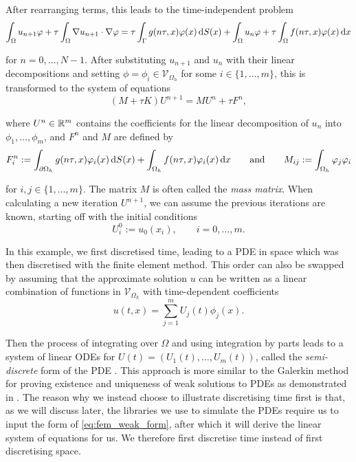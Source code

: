 After rearranging terms, this leads to the time-independent problem
%
\begin{equation}\label{eq:fem_weak_form}
    \int_\Omega u_{n + 1} \varphi + \tau \int_\Omega \nabla u_{n + 1} \cdot \nabla \varphi = \tau \int_\Gamma g(n \tau, x) \varphi(x) \mathop{}\!\mathrm{d} S(x) + \int_\Omega u_n \varphi + \tau \int_\Omega f(n \tau, x) \varphi(x) \mathop{}\!\mathrm{d} x
\end{equation}

\noindent
for $n = 0, \dots, N - 1$. After substituting $u_{n + 1}$ and $u_n$ with their linear decompositions and setting $\phi = \phi_i \in \mathcal{V}_{\Omega_h}$ for some $i \in \{ 1, \dots, m \}$, this is transformed to the system of equations
%
\begin{equation*}
    (M + \tau K) U^{n + 1} = M U^n + \tau F^n,
\end{equation*}

\noindent
where $U^n \in \mathbb{R}^m$ contains the coefficients for the linear decomposition of $u_n$ into $\phi_1, \dots, \phi_m$, and $F^n$ and $M$ are defined by
%
\begin{equation*}
    F^n_i := \int_{\partial \Omega_h} g(n\tau, x) \varphi_i(x)  \mathop{}\!\mathrm{d} S(x) + \int_{\Omega_h} f(n\tau, x) \varphi_i(x) \mathop{}\!\mathrm{d} x \qquad \text{and} \qquad M_{ij} := \int_{\Omega_h} \varphi_j \varphi_i
\end{equation*}

\noindent
for $i, j \in \{1, \dots, m\}$. The matrix $M$ is often called the \emph{mass matrix}. When calculating a new iteration $U^{n + 1}$, we can assume the previous iterations are known, starting off with the initial conditions
%
\begin{equation*}
    U^0_i := u_0(x_i), \qquad i = 0, \dots, m.
\end{equation*}

In this example, we first discretised time, leading to a PDE in space which was then discretised with the finite element method. This order can also be swapped by assuming that the approximate solution $u$ can be written as a linear combination of functions in $\mathcal{V}_{\Omega_h}$ with time-dependent coefficients
%
\begin{equation*}
    u(t, x) = \sum_{j = 1}^{m} U_j(t) \phi_j(x) .
\end{equation*}

\noindent
Then the process of integrating over $\Omega$ and using integration by parts leads to a system of linear ODEs for $U(t) = \left(U_1(t), \dots, U_m(t)\right)$, called the \emph{semi-discrete} form of the PDE \cite{vidar84}. This approach is more similar to the Galerkin method for proving existence and uniqueness of weak solutions to PDEs as demonstrated in \cite{evans2010partial}. The reason why we instead choose to illustrate discretising time first is that, as we will discuss later, the libraries we use to simulate the PDEs require us to input the form of \cref{eq:fem_weak_form}, after which it will derive the linear system of equations for us. We therefore first discretise time instead of first discretising space.

